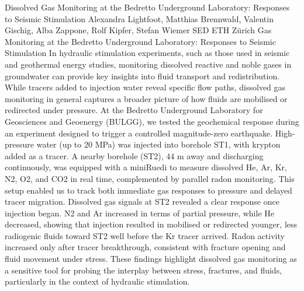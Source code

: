 \begin{conf-abstract}
{Dissolved Gas Monitoring at the Bedretto Underground Laboratory: Responses to Seismic Stimulation}
{Alexandra Lightfoot, Matthias Brennwald, Valentin Gischig, Alba Zappone, Rolf Kipfer, Stefan Wiemer}
{SED ETH Zürich}
{Gas Monitoring at the Bedretto Underground Laboratory: Responses to Seismic Stimulation In hydraulic stimulation experiments, such as those used in seismic and geothermal energy studies, monitoring dissolved reactive and noble gases in groundwater can provide key insights into fluid transport and redistribution. While tracers added to injection water reveal specific flow paths, dissolved gas monitoring in general captures a broader picture of how fluids are mobilised or redirected under pressure. At the Bedretto Underground Laboratory for Geosciences and Geoenergy (BULGG), we tested the geochemical response during an experiment designed to trigger a controlled magnitude-zero earthquake. High-pressure water (up to 20 MPa) was injected into borehole ST1, with krypton added as a tracer. A nearby borehole (ST2), 44 m away and discharging continuously, was equipped with a miniRuedi to measure dissolved He, Ar, Kr, N2, O2, and CO2 in real time, complemented by parallel radon monitoring. This setup enabled us to track both immediate gas responses to pressure and delayed tracer migration. Dissolved gas signals at ST2 revealed a clear response once injection began. N2 and Ar increased in terms of partial pressure, while He decreased, showing that injection resulted in mobilised or redirected younger, less radiogenic fluids toward ST2 well before the Kr tracer arrived. Radon activity increased only after tracer breakthrough, consistent with fracture opening and fluid movement under stress. These findings highlight dissolved gas monitoring as a sensitive tool for probing the interplay between stress, fractures, and fluids, particularly in the context of hydraulic stimulation.}
\end{conf-abstract}
